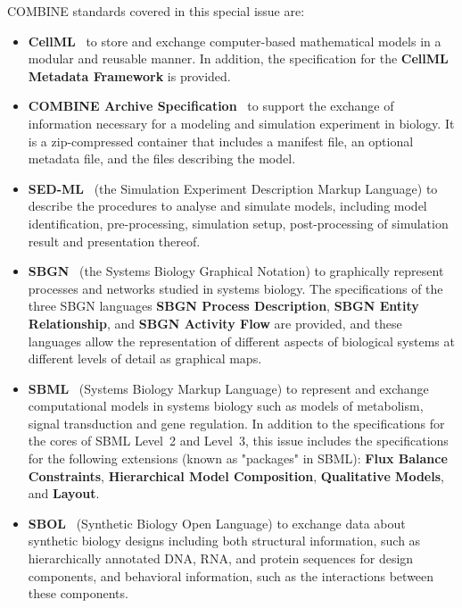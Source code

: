 \documentclass{jib}
\begin{document}
COMBINE standards covered in this special issue are:
\begin{itemize}
\item {\bf CellML}~\cite{cuellar2003overview} to store and exchange computer-based mathematical models in a modular and reusable manner. 
In addition, the specification for the {\bf CellML Metadata Framework} is provided.

\item {\bf COMBINE Archive Specification}~\cite{Bergmann2014combine} to support the exchange of information necessary for a modeling and simulation experiment in biology. 
It is a zip-compressed container that includes a manifest file, an optional metadata file, and the files describing the model. 

\item {\bf SED-ML}~\cite{sedml2011} (the Simulation Experiment Description Markup Language) to describe the procedures to analyse and simulate  models, including model identification, pre-processing, simulation setup, post-processing of simulation result and presentation thereof.

\item {\bf SBGN}~\cite{le2009systems} (the Systems Biology Graphical Notation) to graphically represent processes and networks studied in systems biology. 
The specifications of the three SBGN languages {\bf SBGN Process Description}, {\bf SBGN Entity Relationship}, and {\bf SBGN Activity Flow} are provided, and these languages allow the representation of different aspects of biological systems at different levels of detail as  graphical maps.

\item {\bf SBML}~\cite{hucka2003} (Systems Biology Markup Language) to represent and exchange computational models in systems biology such as models of metabolism, signal transduction and gene regulation. 
In addition to the specifications for the cores of SBML Level~2 and Level~3, this issue includes the specifications for the following extensions (known as "packages" in SBML):  {\bf Flux Balance Constraints}, {\bf Hierarchical Model Composition}, {\bf Qualitative Models}, and {\bf Layout}.

\item {\bf SBOL}~\cite{galdzicki2014} (Synthetic Biology Open Language) to exchange data about synthetic biology designs including both structural information, such as hierarchically annotated DNA, RNA, and protein sequences for design components, and behavioral information, such as the interactions between these components. 
\end{itemize}
\end{document}
